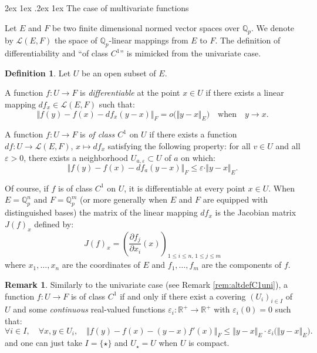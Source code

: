 \documentclass[11pt]{article}
\makeatletter
\numberwithin{equation}{section}
\numberwithin{figure}{section}
\renewcommand\paragraph{\@startsection{paragraph}{4}{\z@}%
                                    {2ex \@plus1ex \@minus.2ex}%
                                    {1ex}%
                                    {\normalfont\normalsize\bfseries}}
\renewcommand{\leq}{\leqslant}
\theoremstyle{definition}
\newtheorem{deftn}[theo]{Definition}
\newtheorem{rem}[theo]{Remark}
\newcommand{\Q}{\mathbb Q}
\newcommand{\Qp}{\Q_p}
\newcommand{\R}{\mathbb R}
\newcommand{\calL}{\mathcal L}
\makeatother
\begin{document}
\paragraph{The case of multivariate functions}

Let $E$ and $F$ be two finite dimensional normed vector spaces over
$\Qp$. We denote by $\calL(E,F)$ the space of $\Qp$-linear mappings 
from $E$ to $F$. The definition of differentiability and ``of class
$C^1$'' is mimicked from the univariate case.

\begin{deftn}
Let $U$ be an open subset of $E$.

A function $f : U \to F$ is \emph{differentiable} at the point 
$x \in U$ if there exists a linear mapping $df_x \in \calL(E,F)$
such that:
$$\Vert f(y) - f(x) - df_x(y{-}x)\Vert_F = o\big(\Vert y{-}x\Vert_E\big)
\quad \text{when} \quad y \to x.$$

A function $f : U \to F$ is \emph{of class $C^1$} on $U$ if there exists 
a function $df : U \to \calL(E,F)$, $x \mapsto df_x$ satisfying the 
following property: for all $v \in U$ and all $\varepsilon > 0$, there 
exists a neighborhood $U_{a,\varepsilon} \subset U$ of $a$ on which:
\begin{equation}
\label{eq:defC1}
\Vert f(y) - f(x) - df_a(y{-}x)\Vert_F \leq  \varepsilon \cdot 
\Vert y{-}x\Vert_E.
\end{equation}
\end{deftn}

Of course, if $f$ is of class $C^1$ on $U$, it is differentiable at 
every point $x \in U$. When $E = \Qp^n$ and $F = \Qp^m$ (or more
generally when $E$ and $F$ are equipped with distinguished bases)
the matrix of the linear mapping $df_x$ is
the Jacobian matrix $J(f)_x$ defined by:
$$J(f)_x = 
\left(\frac{\partial f_j}{\partial x_i}(x)\right)_
{1 \leq i \leq n, \, 1 \leq j \leq m}$$
where $x_1, \ldots, x_n$ are the coordinates of $E$ and $f_1, \ldots,
f_m$ are the components of $f$.

\begin{rem}
\label{rem:altdefC1multi}
Similarly to the univariate case (see Remark \ref{rem:altdefC1uni}), a function 
$f : U \to F$ is of class $C^1$ if and only if there exist a covering 
$(U_i)_{i \in I}$ of $U$ and some \emph{continuous} real-valued
functions $\varepsilon_i : \R^+ \to \R^+$ with $\varepsilon_i(0) = 0$ 
such that:
\begin{equation}
\label{eq:defC1multi2}
\forall i \in I, \quad \forall x, y \in U_i, \quad
\Vert f(y) - f(x) - (y{-}x) f'(x)\Vert_F \leq  \Vert y{-}x\Vert_E \cdot
\varepsilon_i\big(\Vert y{-}x\Vert_E \big).
\end{equation}
and one can just take $I = \{\star\}$ and $U_\star = U$ when $U$ is compact.
\end{rem}
\end{document}
